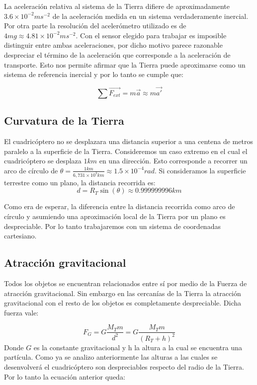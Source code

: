 \documentclass[main]{subfiles}
\begin{document}
La aceleraci\'on relativa al sistema de la Tierra difiere de  aproximadamente $3.6\times10^{-2}ms^{-2}$ de la aceleraci\'on medida en un sistema verdaderamente inercial. Por otra parte la resoluci\'on del aceler\'ometro utilizado es de $4mg\approx 4.81\times10^{-2}ms^{-2}$. Con el sensor elegido para trabajar es imposible distinguir entre ambas aceleraciones, por dicho motivo parece razonable despreciar el t\'ermino de la aceleraci\'on que corresponde a la aceleraci\'on de transporte. Esto nos permite afirmar que la Tierra puede aproximarse como un sistema de referencia inercial y por lo tanto se cumple que:

\begin{equation}
\sum \vec{F_{ext}}=m\vec{a}\approx m\vec{a\prime}
\end{equation}



\subsection{Curvatura de la Tierra}
El cuadric\'optero no se desplazara una distancia superior a una centena de metros paralelo a la superficie de la Tierra. Consideremos un caso extremo en el cual el cuadric\'optero se desplaza $1km$ en una direcci\'on. Esto corresponde a recorrer un arco de c\'irculo de $\theta = \frac{1km}{6,731\times10^{3}km}\approx 1.5\times 10^{-4}rad$. Si consideramos la superficie terrestre como un plano, la distancia recorrida es: 
\begin{equation}
d=R_T\sin(\theta) \approx 0.999999996km
\end{equation}

Como era de esperar, la diferencia entre la distancia recorrida como arco de c\'irculo y asumiendo una aproximaci\'on local de la Tierra por un plano es despreciable. Por lo tanto trabajaremos con un sistema de coordenadas cartesiano.
\subsection{Atracci\'on gravitacional}
Todos los objetos se encuentran relacionados entre s\'i por medio de la Fuerza de atracci\'on gravitacional. Sin embargo en las cercan\'ias de la Tierra la atracci\'on gravitacional con el resto de los objetos es completamente despreciable. Dicha fuerza vale:

\begin{equation}
F_G=G\frac{M_Tm}{d^2}=G\frac{M_Tm}{(R_T+h)^2} 
\end{equation}
Donde $G$ es la constante gravitacional y h la altura a la cual se encuentra una part\'icula.  
Como ya se analizo anteriormente las alturas a las cuales se desenvolver\'a el cuadric\'optero son despreciables respecto del radio de la Tierra. Por lo tanto la ecuaci\'on anterior queda:
\end{document}
